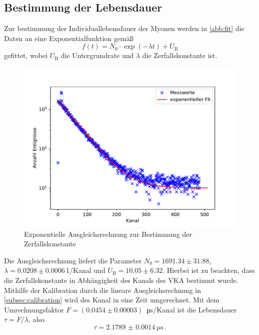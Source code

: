 \subsection{Bestimmung der Lebensdauer}
\label{subsec:lifetime}
Zur bestimmung der Individuallebensdauer der Myonen werden in \autoref{abb:fit} die Daten an eine Exponentialfunktion gemäß
\begin{equation}
f(t) = N_0 \cdot \exp{( -\lambda t)} + U_{\text{B}}
\end{equation}
gefittet, wobei $U_{\text{B}}$ die Untergrundrate und $\lambda$ die Zerfallskonstante ist.
\begin{figure}[h!]
	\centering
	\includegraphics[width=\textwidth]{img/myons.pdf}
	\caption{Exponentielle Ausgleichsrechnung zur Bestimmung der Zerfallskonstante}
	\label{abb:fit}
\end{figure}
Die Ausgleichsrechnung liefert die Parameter $N_0 = 1691.34 \pm 31.88$, $\lambda = 0.0208 \pm 0.0006$\,1/Kanal und $U_\text{B} = 10.05 \pm 6.32$. Hierbei ist zu beachten, dass die Zerfallskonstante in Abhängigkeit des Kanals des VKA bestimmt wurde. Mithilfe der Kalibration durch die lineare Ausgleichsrechnung in \autoref{subsec:calibration} wird des Kanal in eine Zeit umgerechnet. Mit dem Umrechnungsfaktor $F = (0.0454 \pm 0.00003) \,$ \si{\micro\second}/Kanal ist die Lebensdauer $\tau = F / \lambda$, also
\begin{equation}
\tau = \SI[separate-uncertainty=true]{2.1789(14)}{\micro\second} \, .
\end{equation}
